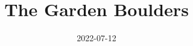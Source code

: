 \documentclass[10pt]{report}
\begin{document}
\title{The Garden Boulders}
\date{2022-07-12}
\maketitle

\newcommand\chapterColor{MidnightBlue}
\twocolumn


\renewcommand\chapterColor{BrickRed}

\renewcommand\chapterColor{BurntOrange}

\renewcommand\chapterColor{PineGreen}

\renewcommand\chapterColor{RoyalPurple}

\renewcommand\chapterColor{Aquamarine}
\renewcommand\chapterColor{MidnightBlue}

\end{document}
